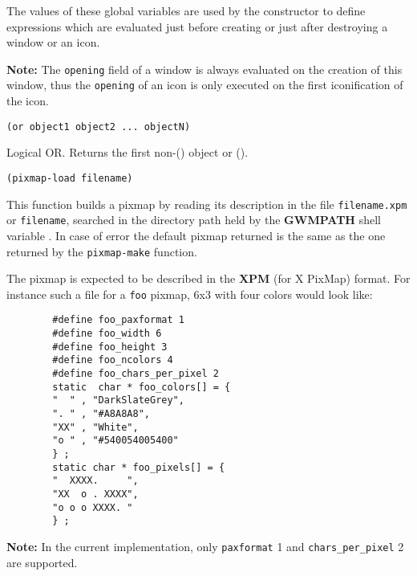 

The values of these global variables are used by the 
constructor to define {\WOOL} expressions which are evaluated just before
creating or just after destroying a window or an icon. 

{\bf Note:} The \verb"opening" field of a window is always evaluated on the
creation of this window, thus the \verb"opening" of an icon is only
executed on the first iconification of the icon.

        
{\usagefont\begin{verbatim}
(or object1 object2 ... objectN)
\end{verbatim}}\usageupspace

Logical OR. Returns the first non-() object or ().

        
{\usagefont\begin{verbatim}
(pixmap-load filename)
\end{verbatim}}\usageupspace

This function builds a pixmap by reading its description in the file
\verb"filename.xpm" or \verb"filename", searched in the directory path held
by the {\bf GWMPATH} shell variable . 
In case of
error the default pixmap returned is the same as the one returned by the
\verb"pixmap-make" function.

The pixmap is expected to be described in the {\bf XPM} (for X PixMap)
format. For instance such a file for a \verb"foo" pixmap, 6x3 with four
colors would look like:

{\exemplefont\begin{verbatim}
        #define foo_paxformat 1
        #define foo_width 6
        #define foo_height 3
        #define foo_ncolors 4
        #define foo_chars_per_pixel 2
        static  char * foo_colors[] = {
        "  " , "DarkSlateGrey",
        ". " , "#A8A8A8",
        "XX" , "White",
        "o " , "#540054005400"  
        } ;
        static char * foo_pixels[] = {
        "  XXXX.     ",
        "XX  o . XXXX",
        "o o o XXXX. "
        } ;
\end{verbatim}}

{\bf Note:} In the current implementation, only \verb"paxformat" 1 and
\verb"chars_per_pixel" 2 are supported.

